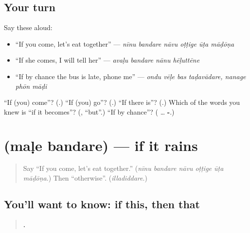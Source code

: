 \subsection*{Your turn}
Say these aloud:

\begin{itemize}
\raggedright
  \item \textquotedblleft{}If you come, let's eat together\textquotedblright{} — \emph{nīnu bandare nāvu oṭṭige ūṭa māḍōṇa}
  \item \textquotedblleft{}If she comes, I will tell her\textquotedblright{} — \emph{avaḷu bandare nānu hēḷuttēne}
  \item \textquotedblleft{}If by chance the bus is late, phone me\textquotedblright{} — \emph{ondu vēḷe bas taḍavādare, nanage phōn māḍi}
\end{itemize}

\begin{tcolorbox}[breakable,colback=teal!4,colframe=teal!35!black,title={Before you move on}]
\textquotedblleft{}If (you) come\textquotedblright{}? (\textbf{}.) \textquotedblleft{}If (you) go\textquotedblright{}? (\textbf{}.) \textquotedblleft{}If there is\textquotedblright{}? (\textbf{}.) Which of the words you knew is \textquotedblleft{}if it becomes\textquotedblright{}? (\textbf{}, \textquotedblleft{}but\textquotedblright{}.) \textquotedblleft{}If by chance\textquotedblright{}? (\textbf{ } … \textbf{-}.)
\end{tcolorbox}
\section[\texorpdfstring{\kn{ಮಳೆ} \kn{ಬಂದರೆ} (maḷe bandare)}{ಮಳೆ ಬಂದರೆ (maḷe bandare)}]{  (maḷe bandare) — if it rains}

\label{lesson:KA-C317-male-bandare}



\begin{quote}
Say \textquotedblleft{}If you come, let's eat together.\textquotedblright{} (\emph{nīnu bandare nāvu oṭṭige ūṭa māḍōṇa}.) Then \textquotedblleft{}otherwise\textquotedblright{}. (\emph{illadiddare}.)
\end{quote}

\subsection*{You'll want to know: if this, then that}
\begin{quote}
\textbf{     .}
\end{quote}

